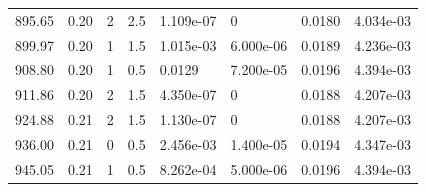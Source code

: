 \documentclass[preview]{standalone}
\begin{document}
{{\begin{tabular}{L{1.2cm}C{1.2cm} C{0.3cm}C{0.5cm} C{1.4cm}C{1.4cm} C{1.4cm}C{1.4cm}}
  895.65  &  0.20  & 2     & 2.5 &  1.109e-07  & 0  & 0.0180 &  4.034e-03   \\ 
  899.97  &  0.20  & 1     & 1.5 &  1.015e-03  & 6.000e-06  & 0.0189 &  4.236e-03   \\ 
  908.80  &  0.20  & 1     & 0.5 &  0.0129  & 7.200e-05  & 0.0196 &  4.394e-03   \\ 
  911.86  &  0.20  & 2     & 1.5 &  4.350e-07  & 0  & 0.0188 &  4.207e-03   \\ 
  924.88  &  0.21  & 2     & 1.5 &  1.130e-07  & 0  & 0.0188 &  4.207e-03   \\ 
  936.00  &  0.21  & 0     & 0.5 &  2.456e-03  & 1.400e-05  & 0.0194 &  4.347e-03   \\ 
  945.05  &  0.21  & 1     & 0.5 &  8.262e-04  & 5.000e-06  & 0.0196 &  4.394e-03   \\ 
\hline 
\end{tabular} 

}}
\end{document}
